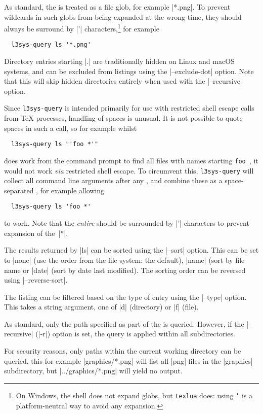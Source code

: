 \documentclass{l3doc}
\begin{document}
\begin{documentation}
As standard, the  is treated as a file glob, for example |*.png|. To
prevent wildcards in such globs from being expanded at the wrong time, they
should always be surround by |'| characters,\footnote{On Windows, the shell does
not expand globs, but \texttt{texlua} does: using \texttt{'} is a
platform-neutral way to avoid any expansion.} for example
\begin{verbatim}
  l3sys-query ls '*.png'
\end{verbatim}

Directory entries starting |.| are traditionally hidden on Linux and macOS systems,
and can be excluded from listings using the |--exclude-dot| option. Note that
this will skip hidden directories entirely when used with the |--recursive|
option.

Since \texttt{l3sys-query} is intended primarily for use with restricted shell
escape calls from \TeX{} processes, handling of spaces is unusual. It is not
possible to quote spaces in such a call, so for example whilst
\begin{verbatim}
  l3sys-query ls "'foo *'"
\end{verbatim}
does work from the command prompt to find all files with names starting
\verb*|foo |, it would not work \emph{via} restricted shell escape. To
circumvent this, \texttt{l3sys-query} will collect all command line arguments
after any , and combine these as a space-separated ,
for example allowing
\begin{verbatim}
  l3sys-query ls 'foo *'
\end{verbatim}
to work. Note that the \emph{entire}  should be surrounded by |'|
characters to prevent expansion of the~|*|.

The results returned by |ls| can be sorted using the |--sort| option. This
can be set to |none| (use the order from the file system: the default),
|name| (sort by file name or |date| (sort by date last modified). The sorting
order can be reversed using |--reverse-sort|.

The listing can be filtered based on the type of entry using the |--type|
option. This takes a string argument, one of |d| (directory) or |f| (file).

As standard, only the path specified as part of the  is queried.
However, if the |--recursive| (|-r|) option is set, the query is applied within
all subdirectories.

For security reasons, only paths within the current working directory can be
queried, this for example |graphics/*.png| will list all |png| files in the
|graphics| subdirectory, but |../graphics/*.png| will yield no output.


\end{documentation}
\end{document}
